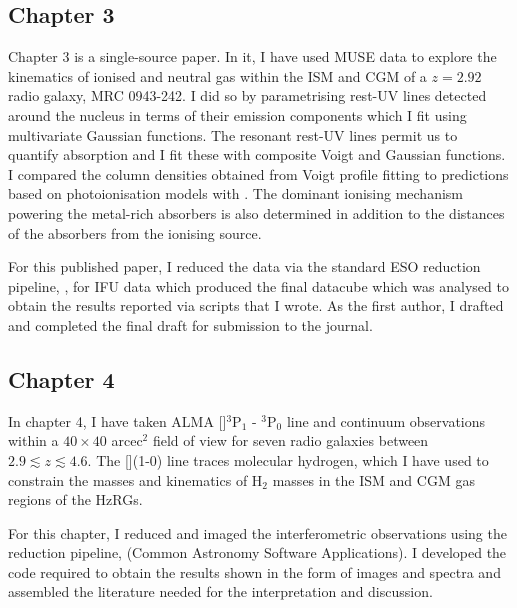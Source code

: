 \subsection{Chapter 3}
Chapter 3 is a single-source paper. In it, I have used MUSE data to explore the kinematics of ionised and neutral gas within the ISM and CGM of a $z=2.92$ radio galaxy, MRC 0943-242. I did so by parametrising rest-UV lines detected around the nucleus in terms of their emission components which I fit using multivariate Gaussian functions. The resonant rest-UV lines permit us to quantify absorption and I fit these with composite Voigt and Gaussian functions. I compared the column densities obtained from Voigt profile fitting to predictions based on photoionisation models with . The dominant ionising mechanism powering the metal-rich absorbers is also determined in addition to the distances of the absorbers from the ionising source. 

For this published paper, I reduced the data via the standard ESO reduction pipeline, , for IFU data which produced the final datacube which was analysed to obtain the results reported via  scripts that I wrote. As the first author, I drafted and completed the final draft for submission to the journal. 

\subsection{Chapter 4}
In chapter 4, I have taken ALMA []$^3$P$_1$ - $^3$P$_0$ line and continuum observations within a $40 \times 40$ arcec$^2$ field of view for seven radio galaxies between $2.9 \lesssim z \lesssim 4.6.$ The [](1-0) line traces molecular hydrogen, which I have used to constrain the masses and kinematics of H$_2$ masses in the ISM and CGM gas regions of the HzRGs. 

For this chapter, I reduced and imaged the interferometric observations using the  reduction pipeline,  (Common Astronomy Software Applications). I developed the  code required to obtain the results shown in the form of images and spectra and assembled the literature needed for the interpretation and discussion. 